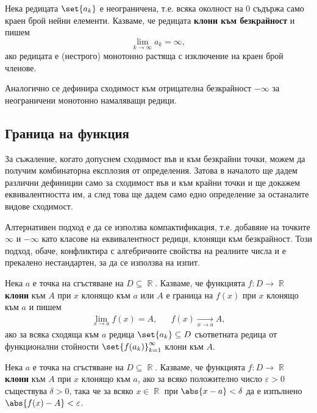 \documentclass{../../common/topic}
\begin{document}
\begin{definition}
  Нека редицата \( \set{ a_k } \) е неограничена, т.е. всяка околност на \( 0 \) съдържа само краен брой нейни елементи. Казваме, че редицата \textbf{клони към безкрайност} и пишем
  \begin{equation*}
    \lim_{k \to \infty} a_k = \infty,
  \end{equation*}
  ако редицата е (нестрого) монотонно растяща с изключение на краен брой членове.

  Аналогично се дефинира сходимост към отрицателна безкрайност \( -\infty \) за неограничени монотонно намаляващи редици.
\end{definition}

\subsection{Граница на функция}

\begin{remark}
  За съжаление, когато допуснем сходимост във и към безкрайни точки, можем да получим комбинаторна експлозия от определения. Затова в началото ще дадем различни дефиниции само за сходимост във и към крайни точки и ще докажем еквивалентността им, а след това ще дадем само едно определение за останалите видове сходимост.

  Алтернативен подход е да се използва компактификация, т.е. добавяне на точките \( \infty \) и \( -\infty \) като класове на еквивалентност редици, клонящи към безкрайност. Този подход, обаче, конфликтира с алгебричните свойства на реалните числа и е прекалено нестандартен, за да се използва на изпит.
\end{remark}

\begin{definition}
  Нека \( a \) е точка на сгъстяване на \( D \subseteq \BbbR \). Казваме, че функцията \( f: D \to \BbbR \) \textbf{клони} към \( A \) при \( x \) клонящо към \( a \) или \( A \) е граница на \( f(x) \) при \( x \) клонящо към \( a \) и пишем
  \begin{align*}
    \lim_{x \to a} f(x) = A,
    &&
    f(x) \xrightarrow[x \to a]{} A,
  \end{align*}
  ако за всяка сходяща към \( a \) редица \( \set{ a_k } \subseteq D \) съответната редица от функционални стойности \( {\set{ f(a_k) }}_{k=1}^\infty \) клони към \( A \).
\end{definition}

\begin{definition}
  Нека \( a \) е точка на сгъстяване на \( D \subseteq \BbbR \). Казваме, че функцията \( f: D \to \BbbR \) \textbf{клони} към \( A \) при \( x \) клонящо към \( a \), ако за всяко положително число \( \varepsilon > 0 \) съществува \( \delta > 0 \), така че за всяко \( x \in \BbbR \) при \( \abs{x - a} < \delta \) да е изпълнено \( \abs{f(x) - A} < \varepsilon \).
\end{definition}
\end{document}
